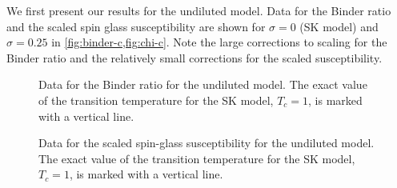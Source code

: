 We first present our results for the undiluted model. Data for the Binder ratio
and the scaled spin glass susceptibility are shown for $\sigma=0$ (SK model)
and $\sigma=0.25$ in \cref{fig:binder-c,fig:chi-c}. Note the large corrections
to scaling for the Binder ratio and the relatively small corrections for the
scaled susceptibility.

\begin{figure}
  \centering
  \begin{subfigure}{0.49\textwidth}
    \centering
    
  \end{subfigure}
  \begin{subfigure}{0.49\textwidth}
    \centering
    
  \end{subfigure}
  \caption[Data for the Binder ratio for the 1-d undiluted spin glass.]{
    Data for the Binder ratio for the undiluted model. The exact value of the
    transition temperature for the SK model, $T_c=1$, is marked with a vertical
    line.
  }
  \label{fig:binder-c}
\end{figure}

\begin{figure}
  \centering
  \begin{subfigure}{0.49\textwidth}
    \centering
    
  \end{subfigure}
  \begin{subfigure}{0.49\textwidth}
    \centering
    
  \end{subfigure}
  \caption[
    Data for the Binder ratio and the scaled spin-glass susceptibility for the
    1-d undiluted spin glass with $\sigma=0$ and $\sigma=0.25$.
  ]{
    Data for the scaled spin-glass susceptibility for the undiluted model. The
    exact value of the transition temperature for the SK model, $T_c=1$, is
    marked with a vertical line.
  }
  \label{fig:chi-c}
\end{figure}

